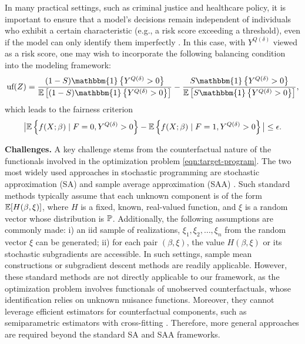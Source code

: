 \begin{example1} \label{example:balanced-class}
In many practical settings, such as criminal justice and healthcare policy, it is important to ensure that a model’s decisions remain independent of individuals who exhibit a certain characteristic (e.g., a risk score exceeding a threshold), even if the model can only identify them imperfectly \citep[e.g.,][]{kleinberg2016inherent}. In this case, with $Y^{Q(\delta)}$ viewed as a risk score, one may wish to incorporate the following balancing condition into the modeling framework:
\begin{align} \label{eqn:g-positive-balance}
    \text{uf}(Z)
    = \frac{(1-S)\mathbbm{1}\left\{Y^{Q(\delta)} > 0\right\} }{\E\left[(1-S)\mathbbm{1}\left\{Y^{Q(\delta)} > 0\right\}\right]}
    - \frac{S\mathbbm{1}\left\{Y^{Q(\delta)} > 0\right\}}{\E\left[S \mathbbm{1}\left\{Y^{Q(\delta)} > 0\right\} \right]}, 
\end{align}
which leads to the fairness criterion
\begin{align*}
\big\vert \mathbb{E}\left\{f(X;\beta) \mid F=0, Y^{Q(\delta)} > 0 \right\} - \mathbb{E}\left\{f(X;\beta) \mid F=1, Y^{Q(\delta)} > 0 \right\} \big\vert \leq \epsilon.
\end{align*}
\end{example1}

\textbf{Challenges.}
A key challenge stems from the counterfactual nature of the functionals involved in the optimization problem \eqref{eqn:target-program}. The two most widely used approaches in stochastic programming are {stochastic approximation} (SA) and {sample average approximation} (SAA) \citep[e.g.,][]{nemirovski2009robust, shapiro2014lectures}. Such standard methods typically assume that each unknown component is of the form $\mathbb{E}[H(\beta,\xi)]$, where $H$ is a fixed, known, real-valued function, and $\xi$ is a random vector whose distribution is $\mathbb{P}$. Additionally, the following assumptions are commonly made: i) an iid sample of realizations,  $\xi_1, \xi_2, \ldots, \xi_n$ from the random vector $\xi$ can be generated; ii) for each pair $(\beta, \xi)$, the value $H(\beta, \xi)$ or its stochastic subgradients are accessible. In such settings, sample mean constructions or subgradient descent methods are readily applicable. However, these standard methods are not directly applicable to our framework, as the optimization problem involves functionals of unobserved counterfactuals, whose identification relies on unknown nuisance functions. Moreover, they cannot leverage efficient estimators for counterfactual components, such as semiparametric estimators with cross-fitting \citep[][]{Chernozhukov17, newey2018cross}. Therefore, more general approaches are required beyond the standard SA and SAA frameworks.



